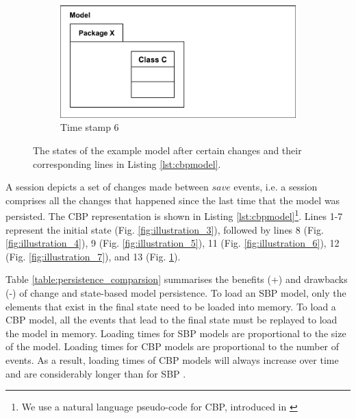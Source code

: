 \documentclass{llncs}
\begin{document}
\begin{figure}[ht]
    \begin{subfigure}[t]{0.329\linewidth}
        \centering
        \includegraphics[width=\linewidth]{images/illustration_8}
        \caption{Time stamp 6}
        \label{fig:illustration_8}
    \end{subfigure}
    
    \caption{The states of the example model after certain changes and their corresponding lines in Listing \ref{lst:cbpmodel}.}
    \label{fig:illustration_cbp}
\end{figure}

A session depicts a set of changes made between $save$ events, i.e. a session comprises all the changes that happened since the last time that the model was persisted. The CBP representation is shown in Listing \ref{lst:cbpmodel}\footnote{We use a natural language pseudo-code for CBP, introduced in \cite{DBLP:conf/models/YohannisKP17,yohannis2018towards}}. Lines 1-7 represent the initial state (Fig. \ref{fig:illustration_3}), followed by lines 8 (Fig. \ref{fig:illustration_4}), 9 (Fig. \ref{fig:illustration_5}), 11 (Fig. \ref{fig:illustration_6}), 12 (Fig. \ref{fig:illustration_7}), and 13 (Fig. \ref{fig:illustration_8}). 

Table \ref{table:persistence_comparsion} summarises the benefits (+) and drawbacks (-) of change and state-based model persistence. To load an SBP model, only the elements that exist in the final state need to be loaded into memory. To load a CBP model, all the events that lead to the final state must be replayed to load the model in memory. Loading times for SBP models are proportional to the size of the model. Loading times for CBP models are proportional to the number of events. As a result, loading times of CBP models will always increase over time and are considerably longer than for SBP \cite{yohannis2018towards,mens2002state}. 
\end{document}
